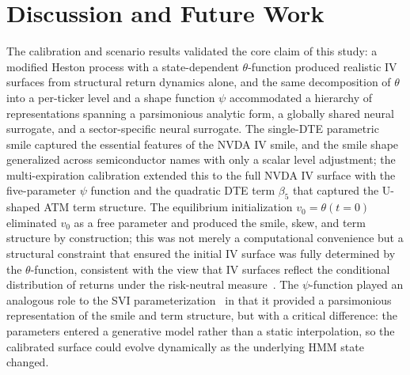 \section{Discussion and Future Work}\label{sec:discussion}

The calibration and scenario results validated the core claim of this study: a modified Heston process with a state-dependent $\theta$-function produced realistic IV surfaces from structural return dynamics alone, and the same decomposition of $\theta$ into a per-ticker level and a shape function $\psi$ accommodated a hierarchy of representations spanning a parsimonious analytic form, a globally shared neural surrogate, and a sector-specific neural surrogate. The single-DTE parametric smile captured the essential features of the NVDA IV smile, and the smile shape generalized across semiconductor names with only a scalar level adjustment; the multi-expiration calibration extended this to the full NVDA IV surface with the five-parameter $\psi$ function and the quadratic DTE term $\beta_5$ that captured the U-shaped ATM term structure. The equilibrium initialization $v_0 = \theta(t\!=\!0)$ eliminated $v_0$ as a free parameter and produced the smile, skew, and term structure by construction; this was not merely a computational convenience but a structural constraint that ensured the initial IV surface was fully determined by the $\theta$-function, consistent with the view that IV surfaces reflect the conditional distribution of returns under the risk-neutral measure~\cite{cont2002}. The $\psi$-function played an analogous role to the SVI parameterization~\cite{gatheral2004} in that it provided a parsimonious representation of the smile and term structure, but with a critical difference: the parameters entered a generative model rather than a static interpolation, so the calibrated surface could evolve dynamically as the underlying HMM state changed.

